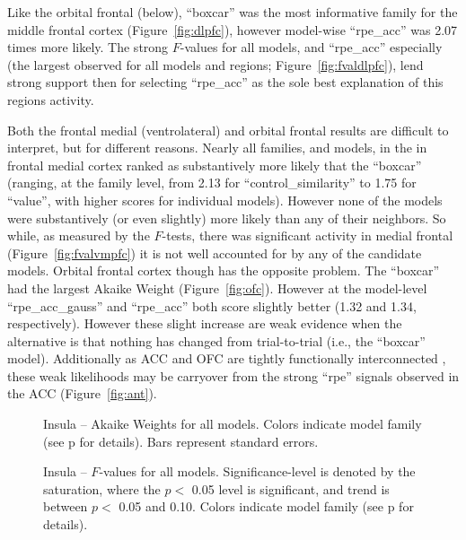 Like the orbital frontal (below), ``boxcar'' was the most informative family for the middle frontal cortex (Figure~\ref{fig:dlpfc}), however model-wise ``rpe\_acc'' was 2.07 times more likely.  The strong $F$-values for all models, and ``rpe\_acc'' especially (the largest observed for all models and regions; Figure~\ref{fig:fvaldlpfc}), lend strong support then for selecting ``rpe\_acc'' as the sole best explanation of this regions activity.

Both the frontal medial (ventrolateral) and orbital frontal results are difficult to interpret, but for different reasons.  Nearly all families, and models, in the in frontal medial cortex ranked as substantively more likely that the ``boxcar'' (ranging, at the family level, from 2.13 for ``control\_similarity'' to 1.75 for ``value'', with higher scores for individual models).  However none of the models were substantively (or even slightly) more likely than any of their neighbors.  So while, as measured by the $F$-tests, there was significant activity in medial frontal (Figure~\ref{fig:fvalvmpfc}) it is not well accounted for by any of the candidate models.  Orbital frontal cortex though has the opposite problem.  The ``boxcar'' had the largest Akaike Weight (Figure~\ref{fig:ofc}).  However at the model-level ``rpe\_acc\_gauss'' and ``rpe\_acc'' both score slightly better (1.32 and 1.34, respectively).  However these slight increase are weak evidence when the alternative is that nothing has changed from trial-to-trial (i.e., the ``boxcar'' model).  Additionally as ACC and OFC are tightly functionally interconnected \cite{Rudebeck:2008p4712}, these weak likelihoods may be carryover from the strong ``rpe'' signals observed in the ACC (Figure~\ref{fig:ant}).

\begin{figure}[tp]
    \centering
    \caption{Insula -- Akaike Weights for all models.  Colors indicate model family (see p\pageref{sub:cmb} for details). Bars represent standard errors.}
    \label{fig:insula}
\end{figure}
\begin{figure}[tp]
    \centering
    \caption{Insula -- $F$-values for all models.
    Significance-level is denoted by the saturation, where the $p <$ 0.05 level is
    significant, and trend is between $p <$ 0.05 and 0.10.  Colors indicate model family (see p\pageref{sub:cmb} for details).}
    \label{fig:fvalinsula}
\end{figure}


